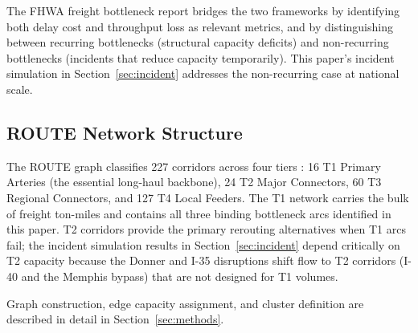 The FHWA freight bottleneck report \citep{FHWA_freight2023} bridges the two frameworks by identifying both delay cost and throughput loss as relevant metrics, and by distinguishing between recurring bottlenecks (structural capacity deficits) and non-recurring bottlenecks (incidents that reduce capacity temporarily). This paper's incident simulation in Section~\ref{sec:incident} addresses the non-recurring case at national scale.

\subsection{ROUTE Network Structure}

The ROUTE graph classifies 227 corridors across four tiers \citep{ROUTE_A1,ROUTE_A2}: 16 T1 Primary Arteries (the essential long-haul backbone), 24 T2 Major Connectors, 60 T3 Regional Connectors, and 127 T4 Local Feeders. The T1 network carries the bulk of freight ton-miles and contains all three binding bottleneck arcs identified in this paper. T2 corridors provide the primary rerouting alternatives when T1 arcs fail; the incident simulation results in Section~\ref{sec:incident} depend critically on T2 capacity because the Donner and I-35 disruptions shift flow to T2 corridors (I-40 and the Memphis bypass) that are not designed for T1 volumes.

Graph construction, edge capacity assignment, and cluster definition are described in detail in Section~\ref{sec:methods}.
